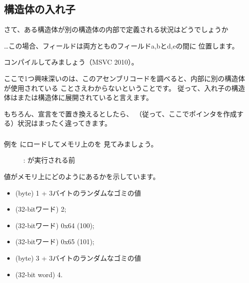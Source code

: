 \subsection{構造体の入れ子}

さて、ある構造体が別の構造体の内部で定義される状況はどうでしょうか



\dots この場合、フィールドは両方とものフィールドa,bとd,eの間に
位置します。

コンパイルしてみましょう（MSVC 2010）。



ここで1つ興味深いのは、このアセンブリコードを調べると、内部に別の構造体が使用されている
ことさえわからないということです。
従って、入れ子の構造体はまたは構造体に展開されていると言えます。

もちろん、宣言をで置き換えるとしたら、
（従って、ここでポインタを作成する）状況はまったく違ってきます。

\clearpage
\subsubsection{\olly}
\myindex{\olly}

例を \olly にロードしてメモリ上のを
見てみましょう。

\begin{figure}[H]
\centering
{}
\caption{\olly: \printf が実行される前}
\label{fig:nested_olly}
\end{figure}

値がメモリ上にどのようにあるかを示しています。
\begin{itemize}
\item {} (byte) 1 + 3バイトのランダムなゴミの値
\item {} (32-bitワード) 2;
\item {} (32-bitワード) 0x64 (100);
\item {} (32-bitワード) 0x65 (101);
\item {} (byte) 3 + 3バイトのランダムなゴミの値
\item {} (32-bit word) 4.
\end{itemize}

